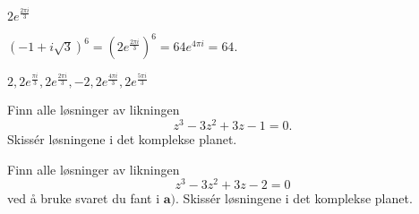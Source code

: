\begin{losning}
\begin{punkt}
$2e^{\frac{2\pi i}{3}}$
\end{punkt}

\begin{punkt}
$(-1+i\sqrt{3})^6=(2e^{\frac{2\pi i}{3}})^6=64e^{4\pi i}=64.$
\end{punkt}

\begin{punkt}
$2,2e^{\frac{\pi i}{3}},2e^{\frac{2\pi i}{3}},-2,2e^{\frac{4\pi i}{3}},2e^{\frac{5\pi i}{3}}$


\begin{center}
\end{center}


\end{punkt}

\end{losning}


\begin{oppgave}
\begin{punkt}
Finn alle løsninger av likningen $$z^3-3z^2+3z-1=0.$$ Skissér løsningene i det komplekse planet.
\end{punkt}
\begin{punkt}
Finn alle løsninger av likningen $$z^3-3z^2+3z-2=0$$ ved å bruke svaret du fant i $\textbf{a)}$. Skissér løsningene i det komplekse planet.
\end{punkt}
\end{oppgave}

